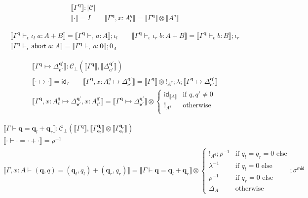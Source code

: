 \documentclass[acmsmall,screen,review]{acmart}
\newcommand{\mc}[1]{\ensuremath{\mathcal{#1}}}
\newcommand{\mb}[1]{\ensuremath{\mathbf{#1}}}
\newcommand{\ms}[1]{\ensuremath{\mathsf{#1}}}
\newcommand{\linl}[1]{\iota_l\;{#1}}
\newcommand{\linr}[1]{\iota_r\;{#1}}
\newcommand{\labort}[1]{\ms{abort}\;{#1}}
\newcommand{\qsp}[4]{#1 \vdash #2 = #3 + #4}
\newcommand{\cwk}[2]{#1 \mapsto #2}
\newcommand{\hasty}[4]{#1 \vdash_{#2} #3: {#4}}
\newcommand{\dnt}[1]{\llbracket{#1}\rrbracket}
\begin{document}
\begin{gather*}
  \boxed{\dnt{\Gamma^{\mb{q}}} : |\mc{C}|} \\
  \dnt{\cdot} = I
  \qquad \dnt{\Gamma^{\mb{q}}, x : A^q_\epsilon} 
          = \dnt{\Gamma^{\mb{q}}} \otimes \dnt{A^q}
\end{gather*}


\begin{gather*}
  \dnt{\hasty{\Gamma^{\mb{q}}}{\epsilon}{\linl{a}}{A + B}}
  = \dnt{\hasty{\Gamma^{\mb{q}}}{\epsilon}{a}{A}} ; \iota_l \qquad
  \dnt{\hasty{\Gamma^{\mb{q}}}{\epsilon}{\linr{b}}{A + B}}
  = \dnt{\hasty{\Gamma^{\mb{q}}}{\epsilon}{b}{B}} ; \iota_r \\
  \dnt{\hasty{\Gamma^{\mb{q}}}{\epsilon}{\labort{a}}{A}}
  = \dnt{\hasty{\Gamma^{\mb{q}}}{\epsilon}{a}{\mb{0}}} ; 0_A
\end{gather*}

\begin{gather*}
  \boxed{\dnt{\cwk{\Gamma^{\mb{q}}}{\Delta^{\mb{q}'}_{\mb{e}'}}} 
    : \mc{C}_\bot(\dnt{\Gamma^{\mb{q}}}, \dnt{\Delta^{\mb{q}'}_{\mb{e}'}})} \\
  \dnt{\cwk{\cdot}{\cdot}} = \ms{id}_I \qquad
  \dnt{\cwk{\Gamma^{\mb{q}}, x : A^q_\epsilon}{\Delta^{\mb{q}'}_{\mb{e}'}}}
    = \dnt{\Gamma^{\mb{q}}} \otimes !_{A^q}
    ; \lambda
    ; \dnt{\cwk{\Gamma^{\mb{q}}}{\Delta^{\mb{q}'}_{\mb{e}'}}} \\
  \dnt{\cwk{\Gamma^{\mb{q}}, x : A^q_\epsilon}
            {\Delta^{\mb{q}'}_{\mb{e}'}, x : A^{q'}_{\epsilon'}}}
    = \dnt{\cwk{\Gamma^{\mb{q}}}{\Delta^{\mb{q}'}_{\mb{e}'}}} \otimes \begin{cases}
      \ms{id}_{\dnt{A}} & \text{if } q, q' \neq 0 \\
      !_{A^q} & \text{otherwise} \\
    \end{cases}
\end{gather*}

\begin{gather*}
  \boxed{\dnt{\qsp{\Gamma}{\mb{q}}{\mb{q}_l}{\mb{q}_r}} 
    : \mc{C}_\bot(\dnt{\Gamma^{\mb{q}}}, 
      \dnt{\Gamma^{\mb{q}_l}_{\mb{e}_l}} \otimes \dnt{\Gamma^{\mb{q}_r}_{\mb{e}_r}})} 
  \\
  \dnt{\qsp{\cdot}{\cdot}{\cdot}{\cdot}} = \rho^{-1}
  \\
  \dnt{\qsp{\Gamma, x : A}{(\mb{q}, q)}{(\mb{q}_l, q_l)}{(\mb{q}_r, q_r)}}
  = \dnt{\qsp{\Gamma}{\mb{q}}{\mb{q}_l}{\mb{q}_r}} \otimes
  \begin{cases}
    !_{A^q} ; \rho^{-1} & \text{if } q_l = q_r = 0 \text{ else} \\
    \lambda^{-1} & \text{if } q_l = 0 \text{ else} \\
    \rho^{-1} & \text{if } q_r = 0 \text{ else} \\
    \Delta_A & \text{otherwise}
  \end{cases} ; \sigma^{\ms{mid}}
\end{gather*}
\end{document}
